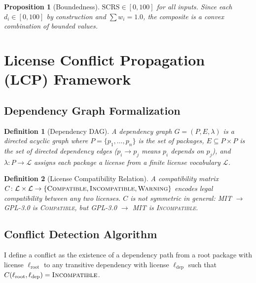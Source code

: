 \documentclass[11pt,twocolumn]{article}
\newtheorem{definition}{Definition}
\newtheorem{proposition}{Proposition}
\begin{document}
\begin{proposition}[Boundedness]
$\mathrm{SCRS} \in [0, 100]$ for all inputs. Since each $d_i \in [0, 100]$ by
construction and $\sum w_i = 1.0$, the composite is a convex combination of
bounded values.
\end{proposition}

\section{License Conflict Propagation (LCP) Framework}

\subsection{Dependency Graph Formalization}

\begin{definition}[Dependency DAG]
A \emph{dependency graph} $G = (P, E, \lambda)$ is a directed acyclic graph
where $P = \{p_1, \ldots, p_n\}$ is the set of packages, $E \subseteq P \times P$
is the set of directed dependency edges ($p_i \to p_j$ means $p_i$ depends on
$p_j$), and $\lambda\colon P \to \mathcal{L}$ assigns each package a license from
a finite license vocabulary $\mathcal{L}$.
\end{definition}

\begin{definition}[License Compatibility Relation]
A \emph{compatibility matrix} $C\colon \mathcal{L} \times \mathcal{L} \to
\{\textsc{Compatible},\allowbreak\textsc{Incompatible},\allowbreak\textsc{Warning}\}$
encodes legal compatibility between any two licenses. $C$ is not symmetric in
general: MIT $\to$ GPL-3.0 is \textsc{Compatible}, but GPL-3.0 $\to$ MIT is
\textsc{Incompatible}.
\end{definition}

\subsection{Conflict Detection Algorithm}

I define a conflict as the existence of a dependency path from a root package
with license $\ell_\mathrm{root}$ to any transitive dependency with license
$\ell_\mathrm{dep}$ such that $C(\ell_\mathrm{root}, \ell_\mathrm{dep}) =
\textsc{Incompatible}$.
\end{document}
